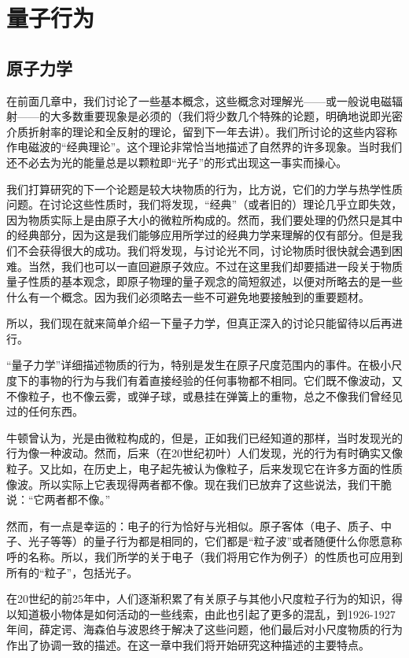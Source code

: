 \chapter{量子行为}

\section{原子力学}

在前面几章中，我们讨论了一些基本概念，这些概念对理解光——或一般说电磁辐射——的大多数重要现象是必须的（我们将少数几个特殊的论题，明确地说即光密介质折射率的理论和全反射的理论，留到下一年去讲）。我们所讨论的这些内容称作电磁波的“经典理论”。这个理论非常恰当地描述了自然界的许多现象。当时我们还不必去为光的能量总是以颗粒即“光子”的形式出现这一事实而操心。

我们打算研究的下一个论题是较大块物质的行为，比方说，它们的力学与热学性质问题。在讨论这些性质时，我们将发现，“经典”（或者旧的）理论几乎立即失效，因为物质实际上是由原子大小的微粒所构成的。然而，我们要处理的仍然只是其中的经典部分，因为这是我们能够应用所学过的经典力学来理解的仅有部分。但是我们不会获得很大的成功。我们将发现，与讨论光不同，讨论物质时很快就会遇到困难。当然，我们也可以一直回避原子效应。不过在这里我们却要插进一段关于物质量子性质的基本观念，即原子物理的量子观念的简短叙述，以便对所略去的是一些什么有一个概念。因为我们必须略去一些不可避免地要接触到的重要题材。

所以，我们现在就来简单介绍一下量子力学，但真正深入的讨论只能留待以后再进行。

“量子力学”详细描述物质的行为，特别是发生在原子尺度范围内的事件。在极小尺度下的事物的行为与我们有着直接经验的任何事物都不相同。它们既不像波动，又不像粒子，也不像云雾，或弹子球，或悬挂在弹簧上的重物，总之不像我们曾经见过的任何东西。

牛顿曾认为，光是由微粒构成的，但是，正如我们已经知道的那样，当时发现光的行为像一种波动。然而，后来（在20世纪初叶）人们发现，光的行为有时确实又像粒子。又比如，在历史上，电子起先被认为像粒子，后来发现它在许多方面的性质像波。所以实际上它表现得两者都不像。现在我们已放弃了这些说法，我们干脆说：“它两者都不像。”

然而，有一点是幸运的：电子的行为恰好与光相似。原子客体（电子、质子、中子、光子等等）的量子行为都是相同的，它们都是“粒子波”或者随便什么你愿意称呼的名称。所以，我们所学的关于电子（我们将用它作为例子）的性质也可应用到所有的“粒子”，包括光子。

在20世纪的前25年中，人们逐渐积累了有关原子与其他小尺度粒子行为的知识，得以知道极小物体是如何活动的一些线索，由此也引起了更多的混乱，到1926-1927年间，薛定谔、海森伯与波恩终于解决了这些问题，他们最后对小尺度物质的行为作出了协调一致的描述。在这一章中我们将开始研究这种描述的主要特点。

